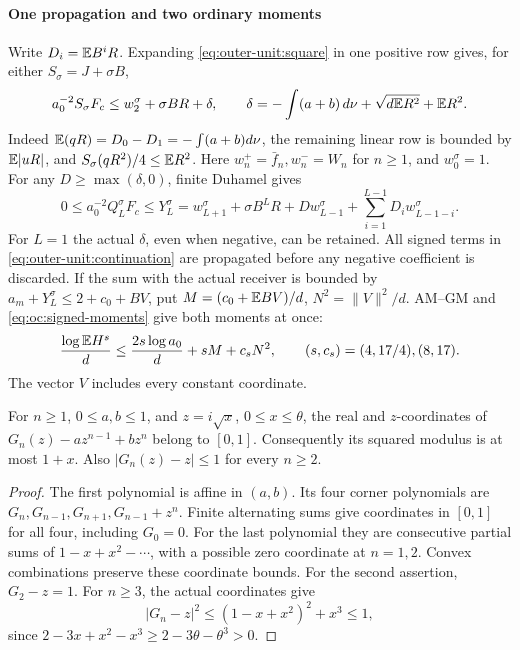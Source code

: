 \paragraph{One propagation and two ordinary moments}
Write \(D_i=\mathbb E B^iR\). Expanding \eqref{eq:outer-unit:square} in one
positive row gives, for either \(S_\sigma=J+\sigma B\),
\begin{equation}\label{eq:outer-unit:first-row}
 a_0^{-2}S_\sigma F_c\le w_2^\sigma+\sigma BR+\delta,\qquad
 \delta=-\int(a+b)\,d\nu+\sqrt{d\mathbb E R^2}+\mathbb E R^2.
\end{equation}
Indeed \(\mathbb E(qR)=D_0-D_1=-\int(a+b)d\nu\), the remaining linear
row is bounded by \(\mathbb E|uR|\), and
\(S_\sigma(qR^2)/4\le\mathbb E R^2\).
Here \(w_n^+=\bar f_n,w_n^-=W_n\) for \(n\ge1\), and \(w_0^\sigma=1\).
For any \(D\ge\max(\delta,0)\), finite Duhamel gives
\begin{equation}\label{eq:outer-unit:continuation}
 0\le a_0^{-2}Q_L^\sigma F_c\le
 Y_L^\sigma=w_{L+1}^\sigma+\sigma B^LR+D w_{L-1}^\sigma
             +\sum_{i=1}^{L-1}D_iw_{L-1-i}^\sigma.
\end{equation}
For \(L=1\) the actual \(\delta\), even when negative, can be retained.
All signed terms in \eqref{eq:outer-unit:continuation} are propagated
before any negative coefficient is discarded.
If the sum with the actual receiver is bounded by
\(a_m+Y_L^\sigma\le2+c_0+BV\), put
\(M=(c_0+\mathbb E BV)/d\), \(N^2=\|V\|^2/d\).
AM--GM and \eqref{eq:oc:signed-moments} give both moments at once:
\begin{equation}\label{eq:outer-unit:payment}
 \frac{\log\mathbb E H^s}{d}
 \le\frac{2s\log a_0}{d}+sM+c_sN^2,
 \qquad (s,c_s)=(4,17/4),(8,17).
\end{equation}
The vector \(V\) includes every constant coordinate.

\begin{lemma}
\label{lem:outer-unit:fractional-tail}
For \(n\ge1\), \(0\le a,b\le1\), and \(z=i\sqrt{x}\), \(0\le x\le\theta\),
the real and \(z\)-coordinates of
\(G_n(z)-az^{n-1}+bz^n\) belong to \([0,1]\).
Consequently its squared modulus is at most \(1+x\).
Also \(|G_n(z)-z|\le1\) for every \(n\ge2\).
\end{lemma}
\begin{proof}
The first polynomial is affine in \((a,b)\). Its four corner polynomials
are \(G_n,G_{n-1},G_{n+1},G_{n-1}+z^n\).
Finite alternating sums give coordinates in \([0,1]\) for all four,
including \(G_0=0\). For the last polynomial they are consecutive
partial sums of \(1-x+x^2-\cdots\), with a possible zero coordinate
at \(n=1,2\). Convex combinations preserve these coordinate bounds.
For the second assertion, \(G_2-z=1\). For \(n\ge3\), the actual
coordinates give
\begin{equation}\label{eq:outer-unit:deleted-z}
 |G_n-z|^2\le(1-x+x^2)^2+x^3\le1,
\end{equation}
since \(2-3x+x^2-x^3\ge2-3\theta-\theta^3>0\).
\end{proof}

